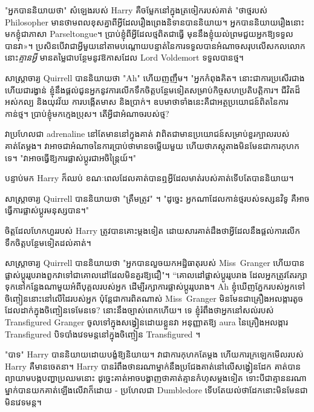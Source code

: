 "អ្នកបាននិយាយថា" សំឡេងរបស់ Harry គឺចម្លែកនៅក្នុងត្រចៀករបស់គាត់ "ថាថ្មរបស់ Philosopher មានថាមពលខុសគ្នាពីអ្វីដែលរឿងព្រេងនិទានបាននិយាយ។ អ្នក​បាន​និយាយ​រឿង​នោះ​មក​ខ្ញុំ​ជា​ភាសា Parseltongue។ ប្រាប់ខ្ញុំពីអ្វីដែលថ្មពិតជាធ្វើ មុននឹងខ្ញុំយល់ព្រមជួយអ្នកឱ្យទទួលបានវា»។ ប្រសិនបើវាជាអ្វីមួយនៅតាមបណ្តោយបន្ទាត់នៃការទទួលបានអំណាចសរុបលើសកលលោក នោះ\emph{គ្មានអ្វី} មានតម្លៃជាបន្ថែមនូវឱកាសដែល Lord Voldemort ទទួលបានថ្ម។

សាស្រ្តាចារ្យ Quirrell បាននិយាយថា "Ah" ហើយញញឹម។ "អ្នកកំពុងគិត។ នោះជាការប្រសើរជាង ហើយជារង្វាន់ ខ្ញុំនឹងផ្តល់ជូនអ្នកនូវការលើកទឹកចិត្តបន្ថែមទៀតសម្រាប់កិច្ចសហប្រតិបត្តិការ។ ជីវិតដ៏អស់កល្ប និងយុវវ័យ ការបង្កើតមាស និងប្រាក់។ ឧបមាថាទាំងនេះគឺជាអត្ថប្រយោជន៍ពិតនៃការកាន់ថ្ម។ ប្រាប់ខ្ញុំមកក្មេងប្រុស។ តើអ្វីជាអំណាចរបស់ថ្ម?

វាប្រហែលជា adrenaline នៅតែមាននៅក្នុងគាត់ វាពិតជាមានប្រយោជន៍សម្រាប់ខួរក្បាលរបស់គាត់តែម្តង។ វា​អាច​ជា​អំណាច​នៃ​ការ​ប្រាប់​ថា​មាន​ចម្លើយ​មួយ ហើយ​ថា​ភស្តុតាង​មិន​មែន​ជា​ការ​កុហក​ទេ។ "វា​អាច​ធ្វើ​ឱ្យ​ការ​ផ្លាស់​ប្តូរ​ជា​អចិន្ត្រៃយ៍។"

បន្ទាប់មក Harry ក៏ឈប់ ខណៈពេលដែលគាត់បានឮអ្វីដែលមាត់របស់គាត់ទើបតែបាននិយាយ។

សាស្រ្តាចារ្យ Quirrell បាននិយាយថា "ត្រឹមត្រូវ" ។ "ដូច្នេះ អ្នកណាដែលកាន់ថ្មរបស់ទស្សនវិទូ គឺអាចធ្វើការផ្លាស់ប្តូរមនុស្សបាន។"

ចិត្តដែលហែកហួររបស់ Harry ត្រូវបានគោះម្តងទៀត ដោយសារគាត់ដឹងថាអ្វីដែលនឹងផ្តល់ការលើកទឹកចិត្តបន្ថែមទៀតដល់គាត់។

សាស្ត្រាចារ្យ Quirrell បាននិយាយថា "អ្នកបានលួចយកអដ្ឋិធាតុរបស់ Miss~Granger ហើយបានផ្លាស់ប្តូររូបរាងពួកវាទៅជាគោលដៅដែលមិនគួរឱ្យជឿ"។ “គោលដៅផ្លាស់ប្តូររូបរាង ដែលអ្នកត្រូវតែរក្សាទុកនៅកន្លែងណាមួយអំពីបុគ្គលរបស់អ្នក ដើម្បីរក្សាការផ្លាស់ប្ដូររូបរាង។ Ah ខ្ញុំឃើញភ្នែករបស់អ្នកទៅចិញ្ចៀននោះនៅលើដៃរបស់អ្នក ប៉ុន្តែជាការពិតណាស់ Miss~Granger មិនមែនជាគ្រឿងអលង្ការតូចដែលដាក់ក្នុងចិញ្ចៀនទេមែនទេ? នោះនឹងច្បាស់ពេកហើយ។ ទេ ខ្ញុំរំពឹងថាអ្នកនៅសល់របស់ Transfigured Granger ចូលទៅក្នុងសង្វៀនដោយខ្លួនវា អនុញ្ញាតឱ្យ aura នៃគ្រឿងអលង្ការ Transfigured បិទបាំងវេទមន្តនៅក្នុងចិញ្ចៀន Transfigured ។

"បាទ" Harry បាននិយាយដោយបង្ខំឱ្យនិយាយ។ វាជាការកុហកតែម្តង ហើយការក្រឡេកមើលរបស់ Harry គឺមានចេតនា។ Harry បានរំពឹងថានរណាម្នាក់នឹងប្រជែងគាត់នៅលើសង្វៀនដែក គាត់បានព្យាយាមបង្កបញ្ហាប្រឈមនោះ ដូច្នេះគាត់អាចបង្ហាញថាគាត់គ្មានកំហុសម្តងទៀត ទោះបីជាគ្មាននរណាម្នាក់បានយកគាត់ឡើងលើវាក៏ដោយ - ប្រហែលជា Dumbledore ទើបតែយល់ថាដែកនោះមិនមែនជា មិនវេទមន្ត។

